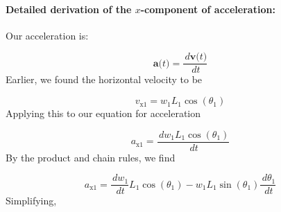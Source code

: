 \documentclass[12pt]{article}
\begin{document}
\paragraph{Detailed derivation of the $x$-component of acceleration:}
\label{GD:accelerationX1Deriv}
Our acceleration is:

\begin{displaymath}
\symbf{a}\text{(}t\text{)}=\frac{\,d\symbf{v}\text{(}t\text{)}}{\,dt}
\end{displaymath}
Earlier, we found the horizontal velocity to be

\begin{displaymath}
{v_{\text{x}1}}={w_{1}} {L_{1}} \cos\left({θ_{1}}\right)
\end{displaymath}
Applying this to our equation for acceleration

\begin{displaymath}
{a_{\text{x}1}}=\frac{\,d{w_{1}} {L_{1}} \cos\left({θ_{1}}\right)}{\,dt}
\end{displaymath}
By the product and chain rules, we find

\begin{displaymath}
{a_{\text{x}1}}=\frac{\,d{w_{1}}}{\,dt} {L_{1}} \cos\left({θ_{1}}\right)-{w_{1}} {L_{1}} \sin\left({θ_{1}}\right) \frac{\,d{θ_{1}}}{\,dt}
\end{displaymath}
Simplifying,
\end{document}
